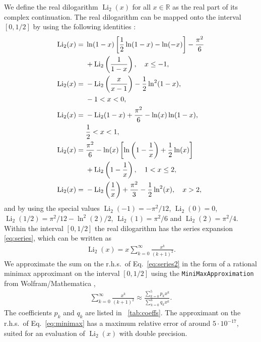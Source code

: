 \documentclass[10pt,DIV16,twocolumn,numbers=noenddot]{scrartcl}
\newcommand{\Li}{\operatorname{Li}_2}
\newcommand{\tabref}[1]{\tablename~\ref{#1}}
\begin{document}
We define the real dilogarithm $\Li(x)$ for all $x\in\mathbb{R}$ as
the real part of its complex continuation.  The real dilogarithm can
be mapped onto the interval $[0,1/2]$ by using the following
identities \cite{lewin}:
%
\begin{align}
  \Li(x) ={}& \ln(1-x)\left[\frac{1}{2}\ln(1-x) - \ln(-x)\right] - \frac{\pi^2}{6}
              \notag \\ &+\Li\left(\frac{1}{1-x}\right), \quad x\leq -1, \\
  \Li(x) ={}& -\Li\left(\frac{x}{x-1}\right) - \frac{1}{2}\ln^2(1-x),
              \notag \\ & -1<x<0, \\
  \Li(x) ={}& -\Li(1-x) + \frac{\pi^2}{6} - \ln(x) \ln(1-x),
              \notag \\ &\frac{1}{2}<x<1, \\
  \Li(x) ={}& \frac{\pi^2}{6} - \ln(x)\left[\ln\left(1-\frac{1}{x}\right) + \frac{1}{2}\ln(x)\right]
              \notag \\ &+ \Li\left(1-\frac{1}{x}\right), \quad 1<x\leq 2, \\
  \Li(x) ={}& -\Li\left(\frac{1}{x}\right) + \frac{\pi^2}{3} - \frac{1}{2} \ln^2(x), \quad x>2,
\end{align}
%
and by using the special values $\Li(-1)=-\pi^2/12$, $\Li(0)=0$,
$\Li(1/2)=\pi^2/12-\ln^2(2)/2$, $\Li(1)=\pi^2/6$ and $\Li(2)=\pi^2/4$.
Within the interval $[0,1/2]$ the real dilogarithm has the series
expansion \eqref{eq:series}, which can be written as
%
\begin{align}
  \Li(x) = x \sum_{k=0}^\infty \frac{x^{k}}{(k+1)^2}.
  \label{eq:series2}
\end{align}
%
We approximate the sum on the r.h.s.\ of Eq.~\eqref{eq:series2} in the
form of a rational minimax approximant on the interval $[0,1/2]$ using
the \texttt{MiniMaxApproximation} from Wolfram/Mathematica
\cite{mathematica},
%
\begin{align}
  \sum_{k=0}^\infty \frac{x^{k}}{(k+1)^2} \approx
  \frac{\sum_{k=0}^5 p_kx^k}{\sum_{k=0}^6 q_kx^k}.
  \label{eq:minimax}
\end{align}
%
The coefficients $p_k$ and $q_k$ are listed in \tabref{tab:coeffs}.
The approximant on the r.h.s.\ of Eq.~\eqref{eq:minimax} has a maximum
relative error of around $5\cdot 10^{-17}$, suited for an evaluation
of $\Li(x)$ with double precision.
%
\end{document}
